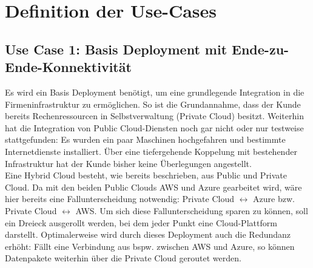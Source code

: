 \chapter{Definition der Use-Cases} \label{Defintion der Use-Cases}




\section{Use Case 1: Basis Deployment mit Ende-zu-Ende-Konnektivität}\label{base-deployment}

Es wird ein Basis Deployment benötigt, um eine grundlegende Integration in die Firmeninfrastruktur zu ermöglichen. So ist die Grundannahme, dass der Kunde bereits Rechenressourcen in Selbstverwaltung (\glqq Private Cloud\grqq{}) besitzt. Weiterhin hat die Integration von Public Cloud-Diensten noch gar nicht oder nur testweise stattgefunden: Es wurden ein paar Maschinen hochgefahren und bestimmte Internetdienste installiert. Über eine tiefergehende Koppelung mit bestehender Infrastruktur hat der Kunde bisher keine Überlegungen angestellt.\\
Eine Hybrid Cloud besteht, wie bereits beschrieben, aus Public und Private Cloud. Da mit den beiden Public Clouds AWS und Azure gearbeitet wird, wäre hier bereits eine Fallunterscheidung notwendig: Private Cloud $\leftrightarrow$ Azure bzw. Private Cloud $\leftrightarrow$ AWS. Um sich diese Fallunterscheidung sparen zu können, soll ein Dreieck ausgerollt werden, bei dem jeder Punkt eine Cloud-Plattform darstellt.
Optimalerweise wird durch dieses Deployment auch die Redundanz erhöht: Fällt eine Verbindung aus bspw. zwischen AWS und Azure, so können Datenpakete weiterhin über die Private Cloud geroutet werden.

